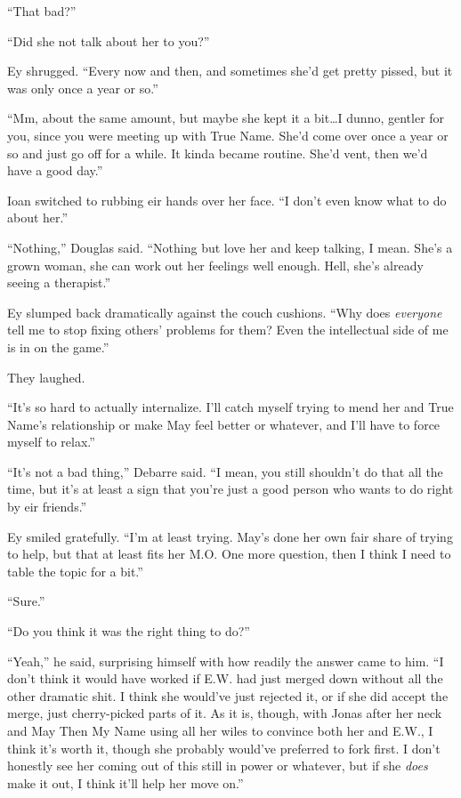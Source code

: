 ``That bad?''

``Did she not talk about her to you?''

Ey shrugged. ``Every now and then, and sometimes she'd get pretty pissed, but it was only once a year or so.''

``Mm, about the same amount, but maybe she kept it a bit\ldots I dunno, gentler for you, since you were meeting up with True Name. She'd come over once a year or so and just go off for a while. It kinda became routine. She'd vent, then we'd have a good day.''

Ioan switched to rubbing eir hands over her face. ``I don't even know what to do about her.''

``Nothing,'' Douglas said. ``Nothing but love her and keep talking, I mean. She's a grown woman, she can work out her feelings well enough. Hell, she's already seeing a therapist.''

Ey slumped back dramatically against the couch cushions. ``Why does \emph{everyone} tell me to stop fixing others' problems for them? Even the intellectual side of me is in on the game.''

They laughed.

``It's so hard to actually internalize. I'll catch myself trying to mend her and True Name's relationship or make May feel better or whatever, and I'll have to force myself to relax.''

``It's not a bad thing,'' Debarre said. ``I mean, you still shouldn't do that all the time, but it's at least a sign that you're just a good person who wants to do right by eir friends.''

Ey smiled gratefully. ``I'm at least trying. May's done her own fair share of trying to help, but that at least fits her M.O. One more question, then I think I need to table the topic for a bit.''

``Sure.''

``Do you think it was the right thing to do?''

``Yeah,'' he said, surprising himself with how readily the answer came to him. ``I don't think it would have worked if E.W. had just merged down without all the other dramatic shit. I think she would've just rejected it, or if she did accept the merge, just cherry-picked parts of it. As it is, though, with Jonas after her neck and May Then My Name using all her wiles to convince both her and E.W., I think it's worth it, though she probably would've preferred to fork first. I don't honestly see her coming out of this still in power or whatever, but if she \emph{does} make it out, I think it'll help her move on.''

